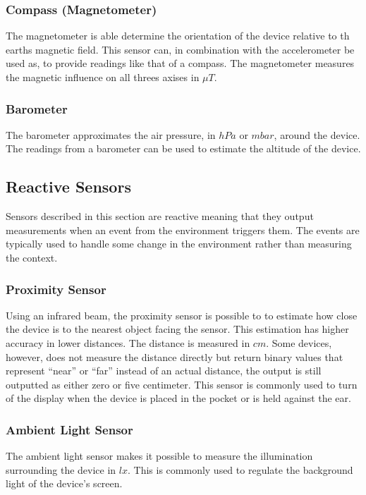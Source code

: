\subsubsection{Compass (Magnetometer)}
The magnetometer is able determine the orientation of the device relative to th earths magnetic field. This sensor can, in combination with the accelerometer be used as, to provide readings like that of a compass. The magnetometer measures the magnetic influence on all threes axises in $\mu T$.

\subsubsection{Barometer}
The barometer approximates the air pressure, in $hPa$ or $mbar$, around the device. The readings from a barometer can be used to estimate the altitude of the device. 

\subsection{Reactive Sensors}
Sensors described in this section are reactive meaning that they output measurements when an event from the environment triggers them. The events are typically used to handle some change in the environment rather than measuring the context.

\subsubsection{Proximity Sensor}
Using an infrared beam, the proximity sensor is possible to to estimate how close the device is to the nearest object facing the sensor. This estimation has higher accuracy in lower distances. The distance is measured in $cm$. Some devices, however, does not measure the distance directly but return binary values that represent ``near'' or ``far'' instead of an actual distance, the output is still outputted as either zero or five centimeter. This sensor is commonly used to turn of the display when the device is placed in the pocket or is held against the ear.

\subsubsection{Ambient Light Sensor}

The ambient light sensor makes it possible to measure the illumination surrounding the device in $lx$. This is commonly used to regulate the background light of the device's screen.

